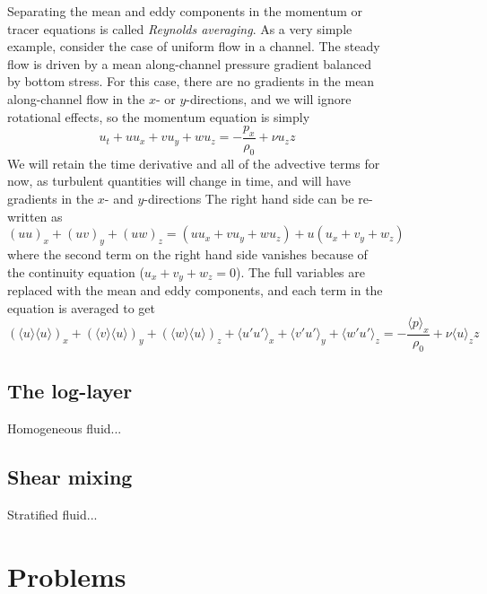 \documentclass[11pt]{report}
\numberwithin{equation}{section}
\begin{document}
\begin{figure}
Separating the mean and eddy components in the momentum or tracer equations is called \emph{Reynolds averaging}.  As a very simple example, consider the case of uniform flow in a channel.  The steady flow is driven by a mean along-channel pressure gradient balanced by bottom stress.  For this case, there are no gradients in the mean along-channel flow in the $x$- or $y$-directions, and we will ignore rotational effects, so the momentum equation is simply
\begin{equation}
    u_t + u u_x + v u_y + w u_z = -\frac{p_x}{\rho_0} + \nu u_zz
\end{equation}
We will retain the time derivative and all of the advective terms for now, as turbulent quantities will change in time, and will have gradients in the $x$- and $y$-directions The right hand side can be re-written as
\begin{equation}
    (u u)_x + (u v)_y + (u w)_z = (u u_x + v u_y + w u_z) + u (u_x + v_y + w_z)
\end{equation}
where the second term on the right hand side vanishes because of the continuity equation ($u_x + v_y + w_z=0$).  The full variables are replaced with the mean and eddy components, and each term in the equation is averaged to get
\begin{equation}
    (\langle u \rangle \langle u \rangle)_x + (\langle v \rangle \langle u \rangle)_y + (\langle w \rangle \langle u \rangle)_z +  \langle u' u' \rangle_x + \langle v' u' \rangle_y + \langle w' u' \rangle_z= -\frac{\langle p \rangle_x}{\rho_0} + \nu \langle u \rangle_zz
\end{equation}

\section{The log-layer}


Homogeneous fluid...

\section{Shear mixing}

Stratified fluid...





\chapter{Problems}


\end{figure}
\end{document}
